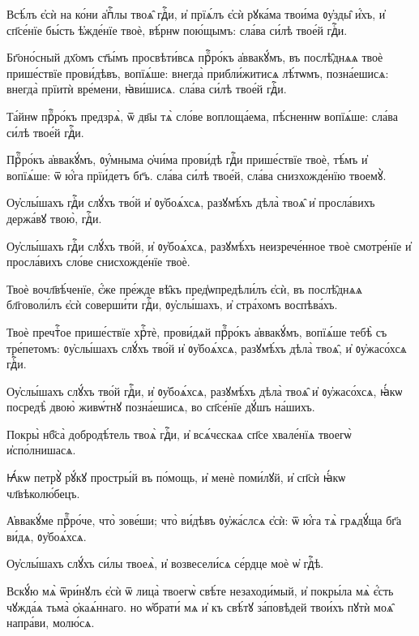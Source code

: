 \hKv Всѣ́лъ є҆сѝ на ко́ни а҆пⷭ҇лы твоѧ̑ гдⷭ҇и, и҆ прїѧ́лъ  є҆сѝ рꙋка́ма твои́ма ᲂу҆зды̑ и҆́хъ, и҆ сп҃се́нїе бы́сть  ѣ҆жде́нїе твоѐ, вѣ́рнѡ пою́щымъ: сла́ва си́лѣ твое́й  гдⷭ҇и. 

\hKv Бг҃оно́сный дх҃омъ ст҃ы́мъ просвѣти́всѧ прⷪ҇ро́къ  а҆ввакꙋ́мъ, въ послѣ̑днѧѧ твоѐ прише́ствїе прови́дѣвъ,  вопїѧ́ше: внегда̀ прибли́житисѧ лѣ́тѡмъ, позна́ешисѧ:  внегда̀ прїитѝ вре́мени, ꙗ҆ви́шисѧ. сла́ва си́лѣ твое́й  гдⷭ҇и. 

\hKv Та́йнѡ прⷪ҇ро́къ предзрѧ̀, ѿ дв҃ы тѧ̀ сло́ве  воплоща́ема, пѣ́сненнѡ вопїѧ́ше: сла́ва  си́лѣ твое́й гдⷭ҇и. 
%

\hKv Прⷪ҇ро́къ а҆ввакꙋ́мъ,  ᲂу҆́мныма ѻ҆чи́ма прови́дѣ гдⷭ҇и прише́ствїе твоѐ,  тѣ́мъ и҆ вопїѧ́ше: ѿ ю҆́га прїи́детъ бг҃ъ. сла́ва си́лѣ  твое́й, сла́ва снизхожде́нїю твоемꙋ̀. 

\hKv Оу҆слы́шахъ гдⷭ҇и слꙋ́хъ тво́й и҆ ᲂу҆боѧ́хсѧ, разꙋмѣ́хъ  дѣла̀ твоѧ̑ и҆ просла́вихъ держа́вꙋ твою̀, гдⷭ҇и. 

\hKv Оу҆слы́шахъ гдⷭ҇и слꙋ́хъ тво́й, и҆ ᲂу҆боѧ́хсѧ, разꙋмѣ́хъ  неизрече́нное твоѐ смотре́нїе и҆ просла́вихъ сло́ве  снисхожде́нїе твоѐ. 

\hKv Твоѐ вочл҃вѣ́ченїе, є҆́же пре́жде вѣ̑къ  пред̾ѡпредѣли́лъ є҆сѝ, въ послѣ̑днѧѧ бл҃говоли́лъ  є҆сѝ соверши́ти гдⷭ҇и, ᲂу҆слы́шахъ, и҆ стра́хомъ  воспѣва́хъ. 

\hKv Твоѐ пречтⷭ҇ое прише́ствїе хрⷭ҇тѐ, прови́дѧй прⷪ҇ро́къ  а҆ввакꙋ́мъ, вопїѧ́ше тебѣ̀ съ тре́петомъ: ᲂу҆слы́шахъ  слꙋ́хъ тво́й и҆ ᲂу҆боѧ́хсѧ, разꙋмѣ́хъ дѣла̀ твоѧ̑, и҆  ᲂу҆жасо́хсѧ гдⷭ҇и.  

\hKv Оу҆слы́шахъ слꙋ́хъ тво́й гдⷭ҇и, и҆ ᲂу҆боѧ́хсѧ, разꙋмѣ́хъ  дѣла̀ твоѧ̑ и҆ ᲂу҆жасо́хсѧ, ꙗ҆́кѡ посредѣ̀ двою̀  живѡ́тнꙋ позна́ешисѧ, во сп҃се́нїе дꙋ́шъ на́шихъ. 

\hKv Покры̀ нб҃са̀ добродѣ́тель твоѧ̀ гдⷭ҇и, и҆ всѧ́чєскаѧ  сп҃се хвале́нїѧ твоегѡ̀ и҆спо́лнишасѧ. 

\hKv Ꙗ҆́кѡ петрꙋ̀ рꙋ́кꙋ простры́й въ по́мощь, и҆ менѐ поми́лꙋй,  и҆ сп҃сѝ ꙗ҆́кѡ чл҃вѣколю́бецъ. 

\hKv А҆ввакꙋ́ме прⷪ҇ро́че, что̀ зове́ши; что̀ ви́дѣвъ  ᲂу҆жа́слсѧ є҆сѝ: ѿ ю҆́га тѧ̀ грѧдꙋ́ща бг҃а ви́дѧ,  ᲂу҆боѧ́хсѧ. 

\hKv Оу҆слы́шахъ слꙋ́хъ си́лы твоеѧ̀, и҆ возвесели́сѧ се́рдце  моѐ ѡ҆ гдⷭ҇ѣ. 
%


\hKv Вскꙋ́ю мѧ̀ ѿри́нꙋлъ є҆сѝ ѿ лица̀ твоегѡ̀ свѣ́те  незаходи́мый, и҆ покры́ла мѧ̀ є҆́сть чꙋжда́ѧ тьма̀  ѻ҆каѧ́ннаго. но ѡ҆брати́ мѧ и҆ къ свѣ́тꙋ за́повѣдей  твои́хъ пꙋтѝ моѧ̑ напра́ви, молю́сѧ.  
%


